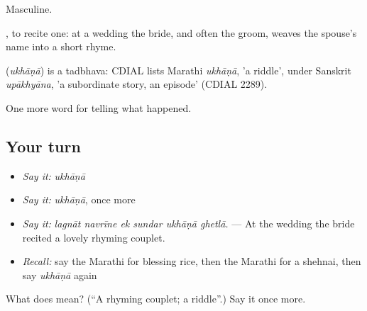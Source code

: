 Masculine.

 , to recite one: at a wedding the bride, and often the groom, weaves the spouse's name into a short rhyme.

\begin{cousinweb}
\textbf{} (\emph{ukhāṇā}) is a tadbhava: CDIAL lists Marathi \emph{ukhāṇā}, 'a riddle', under Sanskrit \emph{upākhyāna}, 'a subordinate story, an episode' (CDIAL 2289).
\end{cousinweb}

\begin{grammarlens}[title={What you've built}]
One more word for telling what happened.
\end{grammarlens}

\subsection*{Your turn}
\begin{itemize}
\raggedright
  \item \emph{Say it:} \emph{ukhāṇā}
  \item \emph{Say it:} \emph{ukhāṇā}, once more
  \item \emph{Say it:} \emph{lagnāt navrīne ek sundar ukhāṇā ghetlā.} — At the wedding the bride recited a lovely rhyming couplet.
  \item \emph{Recall:} say the Marathi for blessing rice, then the Marathi for a shehnai, then say \emph{ukhāṇā} again
\end{itemize}

\begin{tcolorbox}[breakable,colback=teal!4,colframe=teal!35!black,title={Before you move on}]
What does  mean? (\textquotedblleft{}A rhyming couplet; a riddle\textquotedblright{}.) Say it once more.
\end{tcolorbox}
